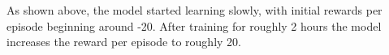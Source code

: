 \documentclass[10pt]{article}
\begin{document}
As shown above, the model started learning slowly, with initial rewards per episode beginning around -20. After training for roughly 2 hours the model increases the reward per episode to roughly 20.




\end{document}
